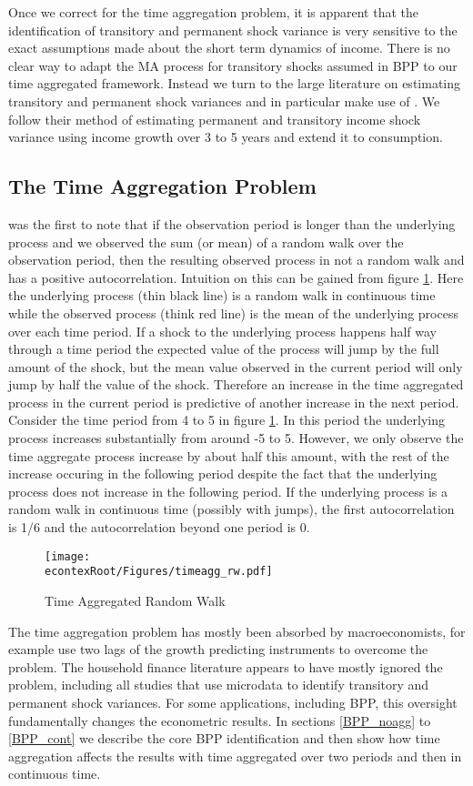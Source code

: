 \documentclass[titlepage]{\econtex}\newcommand{\texname}{IncomeUncertainty}
\begin{document}
Once we correct for the time aggregation problem, it is apparent that the identification of transitory and permanent shock variance is very sensitive to the exact assumptions made about the short term dynamics of income. There is no clear way to adapt the MA process for transitory shocks assumed in BPP to our time aggregated framework. Instead we turn to the large literature on estimating transitory and permanent shock variances and in particular make use of \cite{carroll_nature_1997}. We follow their method of estimating permanent and transitory income shock variance using income growth over 3 to 5 years and extend it to consumption.
\subsection{The Time Aggregation Problem}
\cite{working_note_1960} was the first to note that if the observation period is longer than the underlying process and we observed the sum (or mean) of a random walk over the observation period, then the resulting observed process in not a random walk and has a positive autocorrelation. Intuition on this can be gained from figure \ref{fig:TimeAgg}. Here the underlying process (thin black line) is a random walk in continuous time while the observed process (think red line) is the mean of the underlying process over each time period. If a shock to the underlying process happens half way through a time period the expected value of the process will jump by the full amount of the shock, but the mean value observed in the current period will only jump by half the value of the shock. Therefore an increase in the time aggregated process in the current period is predictive of another increase in the next period. Consider the time period from 4 to 5 in figure \ref{fig:TimeAgg}. In this period the underlying process increases substantially from around -5 to 5. However, we only observe the time aggregate process increase by about half this amount, with the rest of the increase occuring in the following period despite the fact that the underlying process does not increase in the following period. If the underlying process is a random walk in continuous time (possibly with jumps), the first autocorrelation is 1/6 and the autocorrelation beyond one period is 0.
	\begin{figure} 
	\begin{centering}
		\texttt{[image: \\econtexRoot/Figures/timeagg\_rw.pdf]} 
		\caption{Time Aggregated Random Walk}
		\label{fig:TimeAgg}
	\end{centering}
\end{figure}
The time aggregation problem has mostly been absorbed by macroeconomists, for example \cite{campbell_consumption_1989} use two lags of the growth predicting instruments to overcome the problem. The household finance literature appears to have mostly ignored the problem, including all studies that use microdata to identify transitory and permanent shock variances. For some applications, including BPP, this oversight fundamentally changes the econometric results. In sections \ref{BPP_noagg} to \ref{BPP_cont} we describe the core BPP identification and then show how time aggregation affects the results with time aggregated over two periods and then in continuous time.
\end{document}
